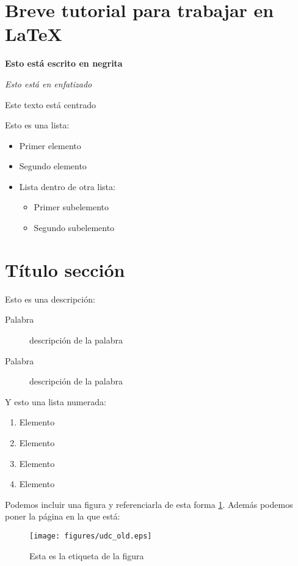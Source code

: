 \section{Breve tutorial para trabajar en LaTeX}



\textbf{Esto está escrito en negrita}


\emph{Esto está en enfatizado}

\begin{center}
Este texto está centrado
\end{center}


Esto es una lista:
\begin{itemize}
\item Primer elemento
\item Segundo elemento
\item Lista dentro de otra lista:
	\begin{itemize}
		\item Primer subelemento
		\item Segundo subelemento
	\end{itemize}
\end{itemize}


\section{Título sección}

Esto es una descripción:
\begin{description}
\item[Palabra] descripción de la palabra
\item[Palabra] descripción de la palabra
\end{description}


Y esto una lista numerada:
\begin{enumerate}
\item Elemento
\item Elemento
\item Elemento
\item Elemento
\end{enumerate}


Podemos incluir una figura y referenciarla de esta forma \ref{fig:logo}. Además podemos poner la página en la que está: \pageref{fig:logo}

\begin{figure}[htp]
\begin{center}
\texttt{[image: figures/udc\_old.eps]}
\caption{Esta es la etiqueta de la figura}
\label{fig:logo}
\end{center}
\end{figure}



